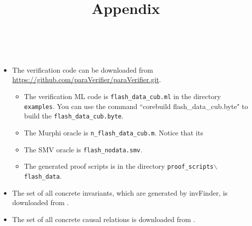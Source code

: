 \documentclass{llncs}
\begin{document}
\title{ Appendix }
\author{~}
\authorrunning{~}
\institute{~}

\maketitle
\begin{itemize}
 \item The verification code can be downloaded from \url{https://github.com/paraVerifier/paraVerifier.git}.
   \begin{itemize}
    \item The verification ML code is {\tt flash\_data\_cub.ml} in the directory {\tt examples}. You can use the command ``corebuild flash\_data\_cub.byte" to build the {\tt flash\_data\_cub.byte}.

     \item The Murphi oracle is {\tt n\_flash\_data\_cub.m}. Notice that its
     \item The SMV oracle is {\tt flash\_nodata.smv}.
     \item The generated proof scripts is  in the directory {\tt proof\_scripts$\backslash$flash\_data}.

  \end{itemize}

  \item   The set of all  concrete invariants, which are generated by {\sf invFinder}, is downloaded from \url{}.

   \item   The set of all  concrete causal relations is downloaded from \url{}.
\end{itemize}





\end{document}
